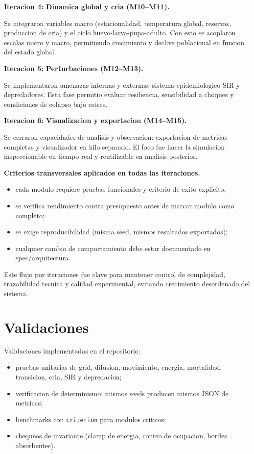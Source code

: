 \documentclass[11pt]{article}
\begin{document}
\textbf{Iteracion 4: Dinamica global y cria (M10--M11).}

Se integraron variables macro (estacionalidad, temperatura global, reservas, produccion de cria) y el ciclo huevo-larva-pupa-adulto. Con esto se acoplaron escalas micro y macro, permitiendo crecimiento y declive poblacional en funcion del estado global.

\textbf{Iteracion 5: Perturbaciones (M12--M13).}

Se implementaron amenazas internas y externas: sistema epidemiologico SIR y depredadores. Esta fase permitio evaluar resiliencia, sensibilidad a choques y condiciones de colapso bajo estres.

\textbf{Iteracion 6: Visualizacion y exportacion (M14--M15).}

Se cerraron capacidades de analisis y observacion: exportacion de metricas completas y visualizador en hilo separado. El foco fue hacer la simulacion inspeccionable en tiempo real y reutilizable en analisis posterior.

\textbf{Criterios transversales aplicados en todas las iteraciones.}

\begin{itemize}
  \item cada modulo requiere pruebas funcionales y criterio de exito explicito;
  \item se verifica rendimiento contra presupuesto antes de marcar modulo como completo;
  \item se exige reproducibilidad (misma seed, mismos resultados exportados);
  \item cualquier cambio de comportamiento debe estar documentado en spec/arquitectura.
\end{itemize}

Este flujo por iteraciones fue clave para mantener control de complejidad, trazabilidad tecnica y calidad experimental, evitando crecimiento desordenado del sistema.

\section*{Validaciones}

Validaciones implementadas en el repositorio:

\begin{itemize}
  \item pruebas unitarias de grid, difusion, movimiento, energia, mortalidad, transicion, cria, SIR y depredacion;
  \item verificacion de determinismo: mismos seeds producen mismos JSON de metricas;
  \item benchmarks con \texttt{criterion} para modulos criticos;
  \item chequeos de invariante (clamp de energia, conteo de ocupacion, bordes absorbentes).
\end{itemize}
\end{document}
